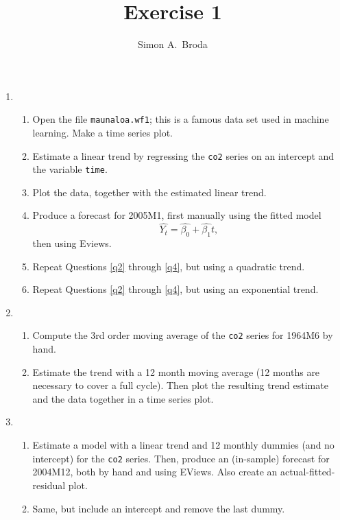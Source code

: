 \documentclass[11pt, a4paper]{article}
\begin{document}
\title{Exercise 1}
\author{Simon A.\ Broda}
\date{}
\maketitle

\begin{enumerate}
\item
\begin{enumerate}
\item \label{q1} Open the file \texttt{maunaloa.wf1}; this is a famous data set used in machine learning. Make a time series plot.
\item \label{q2}Estimate a linear trend by regressing the \texttt{co2} series on an intercept and the variable \texttt{time}.
\item \label{q3}Plot the data, together with the estimated linear trend.
\item \label{q4} Produce a forecast for 2005M1, first manually using the fitted model
\[
\widehat{Y_t} = \widehat{\beta_0}+\widehat{\beta_1} t,
\]
then using Eviews.
\item Repeat Questions \ref{q2} through \ref{q4}, but using a quadratic trend.
\item Repeat Questions \ref{q2} through \ref{q4}, but using an exponential trend.
\end{enumerate}
\item 
\begin{enumerate}
\item Compute the 3rd order moving average of the \texttt{co2} series for 1964M6 by hand.
\item Estimate the trend with a 12 month moving average (12 months are necessary to cover a full cycle). Then plot the resulting trend estimate and the data together in a time series plot.
\end{enumerate}
\item 
\begin{enumerate}
\item Estimate a model with a linear trend and 12 monthly dummies (and no intercept) for the \texttt{co2} series. Then, produce an (in-sample) forecast for 2004M12, both by hand and using EViews. Also create an actual-fitted-residual plot.
\item Same, but include an intercept and remove the last dummy.
\end{enumerate}
\end{enumerate}
\end{document}
